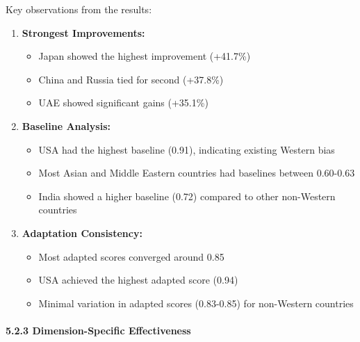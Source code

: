 \documentclass[
]{article}
\providecommand{\tightlist}{%
  \setlength{\itemsep}{0pt}\setlength{\parskip}{0pt}}
\begin{document}
Key observations from the results:

\begin{enumerate}
\def\labelenumi{\arabic{enumi}.}
\tightlist
\item
  \textbf{Strongest Improvements:}

  \begin{itemize}
  \tightlist
  \item
    Japan showed the highest improvement (+41.7\%)
  \item
    China and Russia tied for second (+37.8\%)
  \item
    UAE showed significant gains (+35.1\%)
  \end{itemize}
\item
  \textbf{Baseline Analysis:}

  \begin{itemize}
  \tightlist
  \item
    USA had the highest baseline (0.91), indicating existing Western
    bias
  \item
    Most Asian and Middle Eastern countries had baselines between
    0.60-0.63
  \item
    India showed a higher baseline (0.72) compared to other non-Western
    countries
  \end{itemize}
\item
  \textbf{Adaptation Consistency:}

  \begin{itemize}
  \tightlist
  \item
    Most adapted scores converged around 0.85
  \item
    USA achieved the highest adapted score (0.94)
  \item
    Minimal variation in adapted scores (0.83-0.85) for non-Western
    countries
  \end{itemize}
\end{enumerate}

\paragraph{5.2.3 Dimension-Specific
Effectiveness}\label{dimension-specific-effectiveness}
\end{document}
